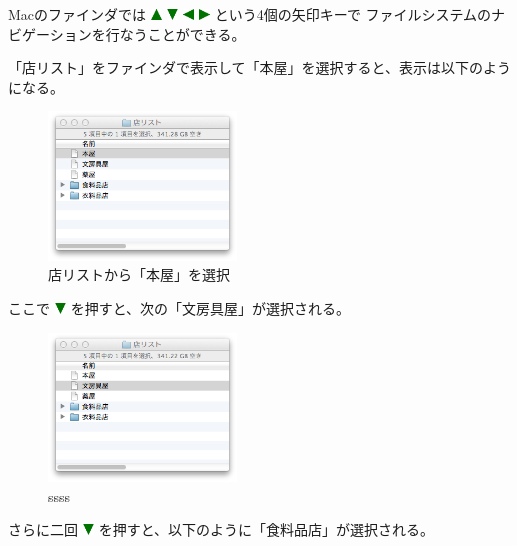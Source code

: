 \documentclass[twoside]{wiss}
\def\figwidth{50mm}
\def\up{ \includegraphics[width=3mm,bb=0 0 36 36]{figures/uptriangle.pdf} }
\def\down{ \includegraphics[width=3mm,bb=0 0 36 36]{figures/downtriangle.pdf} }
\def\right{ \includegraphics[width=3mm,bb=0 0 36 36]{figures/righttriangle.pdf} }
\def\left{ \includegraphics[width=3mm,bb=0 0 36 36]{figures/lefttriangle.pdf} }
\begin{document}
Macのファインダでは
{\up}{\down}{\left}{\right}という4個の矢印キーで
ファイルシステムのナビゲーションを行なうことができる。

「店リスト」をファインダで表示して「本屋」を選択すると、表示は以下のようになる。

\begin{figure}[H]
\centerline{\includegraphics[width=\figwidth,bb=0 0 344 272]{figures/9b121bec45e5b480e5ac64fdd0f82592.png}}
\caption{店リストから「本屋」を選択}
\label{screenshot2}
\end{figure}

\noindent
ここで{\down}を押すと、次の「文房具屋」が選択される。

\begin{figure}[H]
\centerline{\includegraphics[width=\figwidth,bb=0 0 344 272]{figures/f43016d1b524baf414f2c32c48fe9588.png}}
\caption{ssss}
\label{「文房具屋」を選択}
\end{figure}

\noindent
さらに二回{\down}を押すと、以下のように「食料品店」が選択される。
\end{document}
